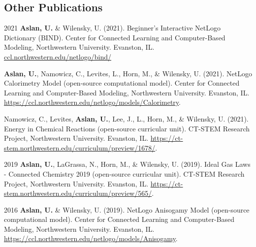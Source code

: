 \documentclass[11pt,letterpaper]{report} %
\begin{document}

    \subsection*{Other Publications}

    \begin{tablist}

        \item[2021] \tab{}\textbf{Aslan, U.} \& Wilensky, U. (2021). Beginner’s Interactive NetLogo Dictionary (BIND). Center for Connected Learning and Computer-Based Modeling, Northwestern University. Evanston, IL. \href{https://ccl.northwestern.edu/netlogo/bind/}{ccl.northwestern.edu/netlogo/bind/}

        \item[]     \tab{}\textbf{Aslan, U.}, Namowicz, C., Levites, L., Horn, M., \& Wilensky, U. (2021). NetLogo Calorimetry Model (open-source computational model). Center for Connected Learning and Computer-Based Modeling, Northwestern University. Evanston, IL. \href{https://ccl.northwestern.edu/netlogo/models/Calorimetry}{https://ccl.northwestern.edu/netlogo/models/Calorimetry}.

        \item[]     \tab{}Namowicz, C., Levites, \textbf{Aslan, U.}, Lee, J., L., Horn, M., \& Wilensky, U. (2021). Energy in Chemical Reactions (open-source curricular unit). CT-STEM Research Project, Northwestern University. Evanston, IL. \href{https://ct-stem.northwestern.edu/curriculum/preview/1678/}{https://ct-stem.northwestern.edu/curriculum/preview/1678/}.

        \item[2019] \tab{}\textbf{Aslan, U.}, LaGrassa, N., Horn, M., \& Wilensky, U. (2019). Ideal Gas Laws - Connected Chemistry 2019 (open-source curricular unit). CT-STEM Research Project, Northwestern University. Evanston, IL. \href{https://ct-stem.northwestern.edu/curriculum/preview/565/}{https://ct-stem.northwestern.edu/curriculum/preview/565/}.

         \item[2016]     \tab{}\textbf{Aslan, U.} \& Wilensky, U. (2019). NetLogo Anisogamy Model (open-source computational model). Center for Connected Learning and Computer-Based Modeling, Northwestern University. Evanston, IL. \href{https://ccl.northwestern.edu/netlogo/models/Anisogamy}{https://ccl.northwestern.edu/netlogo/models/Anisogamy}.

    \end{tablist}
\end{document}
